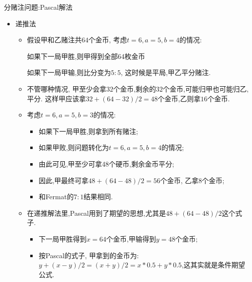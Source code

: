 \begin{frame}{分赌注问题:{\rm Pascal}解法}
	\begin{itemize}[<+-|alert@+>]
		\item 递推法
		\begin{itemize}[<+-|alert@+>]
			\item 假设甲和乙赌注共$64$个金币, 考虑$t=6,a=5,b=4$的情况:

			如果下一局甲胜,则甲得到全部64枚金币

			如果下一局甲输,则比分变为$5:5$, 这时候是平局,甲乙平分赌注.

			\item 不管哪种情况, 甲至少会拿$32$个金币,剩余的$32$个金币,可能归甲也可能归乙,平分. 这样甲应该拿$32+(64-32)/2=48$个金币,乙则拿$16$个金币.
			\item 考虑$t=6,a=5,b=3$的情况:
			\begin{itemize}[<+-|alert@+>]
				\item 如果下一局甲胜,则拿到所有赌注;
				\item 如果甲败,则问题转化为$t=6,a=5,b=4$的情况;
				\item 由此可见,甲至少可拿48个硬币,剩余金币平分;
				\item 因此,甲最终可拿$48+(64-48)/2=56$个金币, 乙拿8个金币;
				\item 和Fermat的$7:1$结果相同.
			\end{itemize}





		\item 在递推解法里,Pascal用到了期望的思想,尤其是$48+(64-48)/2$这个式子.
		\begin{itemize}[<+-|alert@+>]
			\item 下一局甲胜得到$x=64$个金币,甲输得到$y=48$个金币;
			\item 按Pascal的式子, 甲拿到的金币为: $y+(x-y)/2=(x+y)/2=x*0.5+y*0.5$,这其实就是条件期望公式.
		\end{itemize}

		\end{itemize}

	\end{itemize}

	\end{frame}

